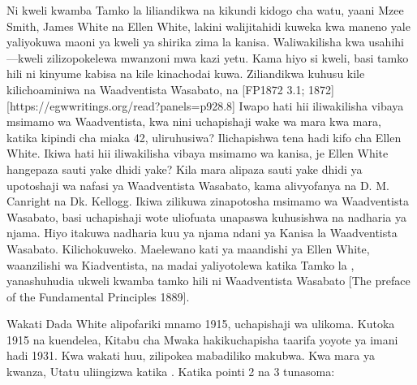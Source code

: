 Ni kweli kwamba Tamko la  liliandikwa na kikundi kidogo cha watu, yaani Mzee Smith, James White na Ellen White, lakini walijitahidi kuweka kwa maneno yale yaliyokuwa maoni ya kweli ya shirika zima la kanisa. Waliwakilisha kwa usahihi —kweli zilizopokelewa mwanzoni mwa kazi yetu. Kama hiyo si kweli, basi tamko hili ni kinyume kabisa na kile kinachodai kuwa. Ziliandikwa  kuhusu kile kilichoaminiwa na Waadventista Wasabato,  na [FP1872 3.1; 1872][https://egwwritings.org/read?panels=p928.8] Iwapo hati hii iliwakilisha vibaya msimamo wa Waadventista, kwa nini uchapishaji wake wa mara kwa mara, katika kipindi cha miaka 42, uliruhusiwa? Ilichapishwa tena hadi kifo cha Ellen White. Ikiwa hati hii iliwakilisha vibaya msimamo wa kanisa, je Ellen White hangepaza sauti yake dhidi yake? Kila mara alipaza sauti yake dhidi ya upotoshaji wa nafasi ya Waadventista Wasabato, kama alivyofanya na D. M. Canright na Dk. Kellogg. Ikiwa  zilikuwa zinapotosha msimamo wa Waadventista Wasabato, basi uchapishaji wote uliofuata unapaswa kuhusishwa na nadharia ya njama. Hiyo itakuwa nadharia kuu ya njama ndani ya Kanisa la Waadventista Wasabato. Kilichokuweko. Maelewano kati ya maandishi ya Ellen White, waanzilishi wa Kiadventista, na madai yaliyotolewa katika Tamko la , yanashuhudia ukweli kwamba tamko hili ni  Waadventista Wasabato [The preface of the Fundamental Principles 1889].


Wakati Dada White alipofariki mnamo 1915, uchapishaji wa  ulikoma. Kutoka 1915 na kuendelea, Kitabu cha Mwaka hakikuchapisha taarifa yoyote ya imani hadi 1931. Kwa wakati huu,  zilipokea mabadiliko makubwa. Kwa mara ya kwanza, Utatu uliingizwa katika . Katika pointi 2 na 3 tunasoma:




